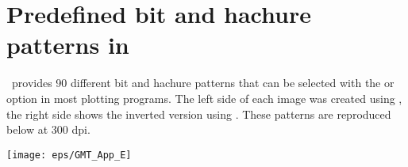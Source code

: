 %
%
\chapter{Predefined bit and hachure patterns in \gmt}
\label{app:E}
\thispagestyle{headings}

\GMT\ provides 90 different bit and hachure patterns that can be
selected with the  or  option in most plotting programs.
The left side of each image was created using , the right side
shows the inverted version using .
These patterns are reproduced below at 300 dpi.

\begin{center}
\texttt{[image: eps/GMT\_App\_E]}
\end{center}
